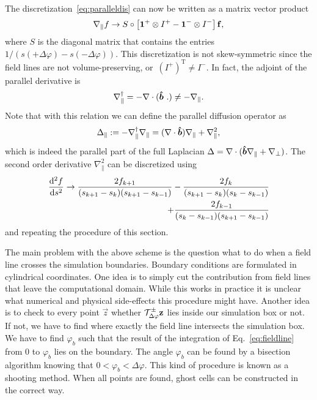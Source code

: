 The discretization~\eqref{eq:paralleldis} can now be written as a matrix vector product
\begin{align}
    \nabla_\parallel f \rightarrow S \circ \left[ \mathbf{1}^+\otimes I^+ - \mathbf{1}^- \otimes I^-  \right] {\mathbf{f}}, 
    \label{}
\end{align}
where $S$ is the diagonal matrix that contains the entries $1/(s(+\Delta\varphi) - s(-\Delta\varphi))$.
This discretization is not skew-symmetric since the
field lines are not volume-preserving, or~$(I^+)^\mathrm{T} \neq I^-$.
In fact, the adjoint of the parallel derivative is
\begin{align}
    \nabla_\parallel^\dagger = - \nabla\cdot(\bm{\hat{b}}\ . ) \neq -\nabla_\parallel.
    \label{}
\end{align}
Note that with this relation we can define the parallel 
diffusion operator as
\begin{align}
    \Delta_\parallel := -\nabla_\parallel^\dagger \nabla_\parallel = (\nabla\cdot \bm{\hat{b}}) \nabla_\parallel + \nabla_\parallel^2 , 
    \label{}
\end{align}
which is indeed the parallel part of the full Laplacian $\Delta = \nabla\cdot( \bm{\hat{b}} \nabla_\parallel + \nabla_\perp)$.
The second order derivative $\nabla_\parallel^2$ can be 
discretized using 
\begin{align}
    \frac{\mathrm{d}^2 f}{\mathrm{d} s^2} \rightarrow  
    \frac{2f_{k+1} }{(s_{k+1}-s_k)(s_{k+1}-s_{k-1})} -
    \frac{2f_k}{(s_{k+1}-s_k)(s_k - s_{k-1})} \nonumber\\ + 
    \frac{2f_{k-1} }{(s_{k}-s_{k-1})(s_{k+1}-s_{k-1})} 
    \label{}
\end{align}
and repeating the procedure of this section.

The main problem with the above scheme is the question what
 to do when a field line crosses the simulation boundaries. 
Boundary conditions are formulated in cylindrical coordinates. 
One idea is to simply cut the contribution from field lines
that leave the computational domain. While this works in practice
it is unclear what numerical and physical side-effects this procedure might have. 
Another idea is to check to every point $\vec z$ whether $\mathcal T^\pm_{\Delta\varphi} {\mathbf{z}}$
lies inside our simulation box or not. If not, we have to find where exactly the 
field line intersects the simulation box.  We have to find
$\varphi_b$ such that the result of the integration of Eq.~\eqref{eq:fieldline} from 
$0$ to $\varphi_b$ lies on the boundary. 
The angle $\varphi_b$ can be found by a bisection algorithm knowing that $0<\varphi_b < \Delta\varphi$. 
This kind of procedure is known as a shooting method. 
When all points are found, ghost cells can be constructed in the correct way. 

